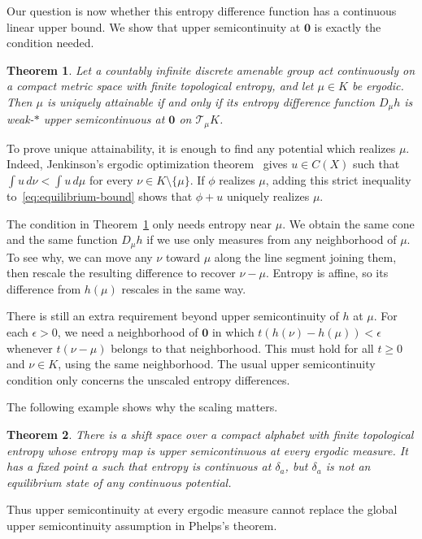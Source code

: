\documentclass[10pt]{amsart}
\numberwithin{equation}{section}
\newtheorem{mainthm}{Theorem}
\newcommand{\CT}{\mathcal T}
\newcommand{\zeromeasure}{\mathbf{0}}
\begin{document}
Our question is now whether this entropy difference function has a
continuous linear upper bound. We show that upper semicontinuity at
$\zeromeasure$ is exactly the condition needed.

\begin{mainthm}\label{thm:main}
Let a countably infinite discrete amenable group act continuously on a compact
metric space with finite topological entropy, and let $\mu\in K$ be
ergodic. Then $\mu$ is uniquely attainable if and only if its entropy
difference function $D_\mu h$ is
weak\nobreakdash-$*$ upper semicontinuous at $\zeromeasure$ on $\CT_\mu K$.
\end{mainthm}

To prove unique attainability, it is enough to find any potential
which realizes $\mu$. Indeed,
Jenkinson's ergodic optimization theorem~\cite[Theorem~1]{jenkinson}
gives $u\in C(X)$ such that $\int u\,d\nu<\int u\,d\mu$ for every
$\nu\in K\setminus\{\mu\}$. If $\phi$ realizes $\mu$, adding this
strict inequality to~\eqref{eq:equilibrium-bound} shows that $\phi+u$
uniquely realizes $\mu$.

The condition in Theorem~\ref{thm:main} only needs entropy near $\mu$.
We obtain the same cone and the same function $D_\mu h$ if we use
only measures from any neighborhood of $\mu$. To see why, we can move
any $\nu$ toward $\mu$ along the line segment joining them, then
rescale the resulting difference to recover $\nu-\mu$. Entropy is
affine, so its difference from $h(\mu)$ rescales in the same way.

There is still an extra requirement beyond upper semicontinuity of
$h$ at $\mu$. For each $\epsilon>0$, we need a neighborhood of $\zeromeasure$
in which $t(h(\nu)-h(\mu))<\epsilon$ whenever $t(\nu-\mu)$ belongs
to that neighborhood. This must hold for all $t\geq0$ and $\nu\in K$,
using the same neighborhood. The usual upper semicontinuity condition
only concerns the unscaled entropy differences.

The following example shows why the scaling matters.

\begin{mainthm}\label{thm:example}
There is a shift space over a compact alphabet with finite topological
entropy whose entropy map is upper semicontinuous at every ergodic
measure. It has a fixed point $a$ such that entropy is continuous at
$\delta_a$, but $\delta_a$ is not an equilibrium state of any
continuous potential.
\end{mainthm}

Thus upper semicontinuity at every ergodic measure cannot replace
the global upper semicontinuity assumption in Phelps's theorem.
\end{document}
